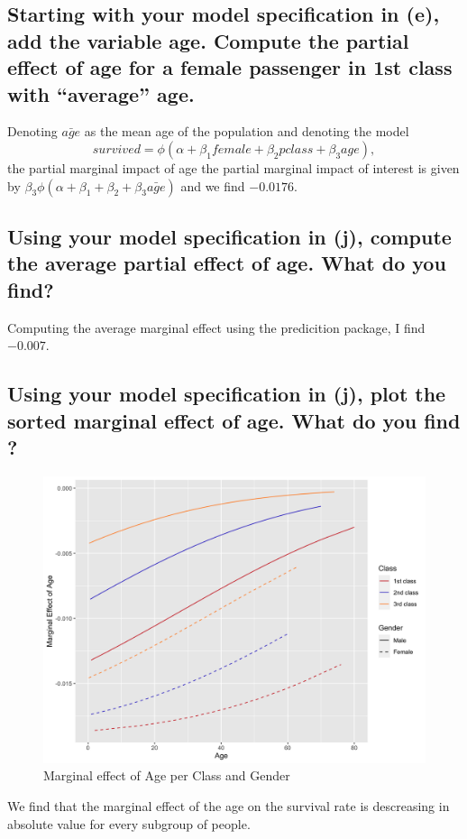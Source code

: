 \documentclass[12pt]{article}
\begin{document}
\subsection{Starting with your model specification in (e), add the variable age. Compute the partial effect of age for a female passenger in 1st class with “average” age.}

Denoting $\bar{age}$ as the mean age of the population and denoting the model
$$survived = \phi(\alpha + \beta_1 female + \beta_2 pclass + \beta_3 age),$$ the partial marginal impact of age 
the partial marginal impact of interest is given by $\beta_3 \phi(\alpha + \beta_1 + \beta_2 + \beta_3 \bar{age})$ and we find $-0.0176$.
\subsection{Using your model specification in (j), compute the average partial effect of age. What do you find?}
Computing the average marginal effect using the predicition package, I find $-0.007$.
\subsection{Using your model specification in (j), plot the sorted marginal effect of age. What do you find ?}
\begin{figure}[h]
    \centering
    \includegraphics[width=1\textwidth]{OUTPUT/marginal_effect_age.png}
    \caption{Marginal effect of Age per Class and Gender}
    \label{fig:marginal_effect_age}
  \end{figure}
We find that the marginal effect of the age on the survival rate is descreasing in absolute value for every subgroup of people.
\end{document}
